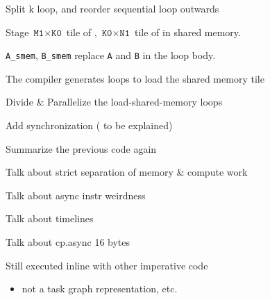 {\LARGE
Split k loop, and reorder sequential  loop outwards
}

\newpage
{}

{\large

}

{\LARGE
Stage $\texttt{M1} \times \texttt{K0}$ tile of , $\texttt{K0} \times \texttt{N1}$ tile of  in shared memory.

\texttt{A\_smem}, \texttt{B\_smem} replace \texttt{A} and \texttt{B} in the loop body.
}

\newpage
{}

{\large

}

{\LARGE
The compiler generates loops to load the shared memory tile
}

\newpage
{}

{\large

}

{\LARGE
Divide \& Parallelize the load-shared-memory loops
}

\newpage
{}

{\large

}

{\LARGE
Add synchronization ( to be explained)
}

\newpage
{}

{\LARGE
Summarize the previous code again

Talk about strict separation of memory \& compute work

Talk about async instr weirdness

Talk about timelines

Talk about cp.async 16 bytes

}


\newpage
{}

{\LARGE

Still executed inline with other imperative code
\begin{itemize}
  \item not a task graph representation, etc.
\end{itemize}

}


\newpage
{}

{\large

}

